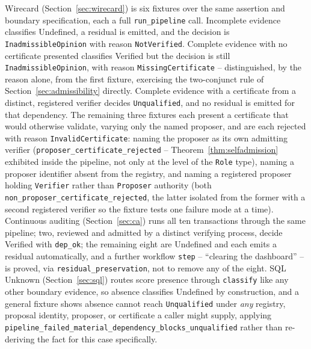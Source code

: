 \documentclass[smallcondensed,envcountsect,natbib]{svjour3}
\newcommand{\state}[1]{\textsf{#1}}
\begin{document}
Wirecard (Section~\ref{sec:wirecard}) is six fixtures over the same assertion and boundary specification, each a full \texttt{run\_pipeline} call. Incomplete evidence classifies \state{Undefined}, a residual is emitted, and the decision is \texttt{InadmissibleOpinion} with reason \texttt{NotVerified}. Complete evidence with no certificate presented classifies \state{Verified} but the decision is still \texttt{InadmissibleOpinion}, with reason \texttt{MissingCertificate} -- distinguished, by the reason alone, from the first fixture, exercising the two-conjunct rule of Section~\ref{sec:admissibility} directly. Complete evidence with a certificate from a distinct, registered verifier decides \texttt{Unqualified}, and no residual is emitted for that dependency. The remaining three fixtures each present a certificate that would otherwise validate, varying only the named proposer, and are each rejected with reason \texttt{InvalidCertificate}: naming the proposer as its own admitting verifier (\texttt{proposer\_certificate\_rejected} -- Theorem~\ref{thm:selfadmission} exhibited inside the pipeline, not only at the level of the \texttt{Role} type), naming a proposer identifier absent from the registry, and naming a registered proposer holding \texttt{Verifier} rather than \texttt{Proposer} authority (both \texttt{non\_proposer\_certificate\_rejected}, the latter isolated from the former with a second registered verifier so the fixture tests one failure mode at a time). Continuous auditing (Section~\ref{sec:ca}) runs all ten transactions through the same pipeline; two, reviewed and admitted by a distinct verifying process, decide \state{Verified} with \texttt{dep\_ok}; the remaining eight are \state{Undefined} and each emits a residual automatically, and a further workflow \texttt{step} -- ``clearing the dashboard'' -- is proved, via \texttt{residual\_preservation}, not to remove any of the eight. SQL Unknown (Section~\ref{sec:sql}) routes score presence through \texttt{classify} like any other boundary evidence, so absence classifies \state{Undefined} by construction, and a general fixture shows absence cannot reach \texttt{Unqualified} under \emph{any} registry, proposal identity, proposer, or certificate a caller might supply, applying \texttt{pipeline\_failed\_material\_dependency\_blocks\_unqualified} rather than re-deriving the fact for this case specifically.
\end{document}
